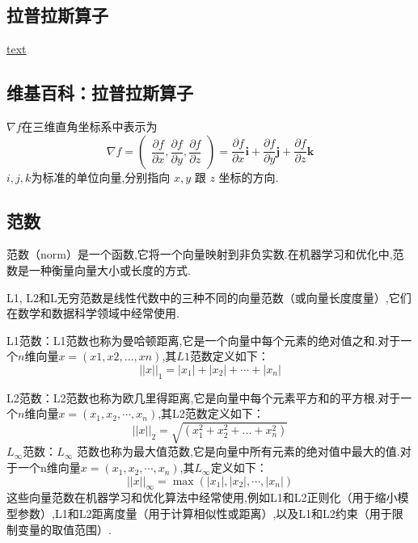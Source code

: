 \documentclass{book}
\begin{document}
\subsection{拉普拉斯算子}
\href{https://zh.wikipedia.org/zh-hans/%E6%8B%89%E6%99%AE%E6%8B%89%E6%96%AF%E7%AE%97%E5%AD%90}{text}
\subsection{维基百科：拉普拉斯算子}
$\nabla f$在三维直角坐标系中表示为
\begin{equation}
  {\displaystyle \nabla f={\begin{pmatrix}{\dfrac {\partial f}{\partial x}},{\dfrac {\partial f}{\partial y}},{\dfrac {\partial f}{\partial z}}\end{pmatrix}}={\dfrac {\partial f}{\partial x}}\mathbf {i} +{\dfrac {\partial f}{\partial y}}\mathbf {j} +{\dfrac {\partial f}{\partial z}}\mathbf {k} }
\end{equation}
$i, j, k $为标准的单位向量,分别指向 $x, y$ 跟 $z$ 坐标的方向.
\subsection{范数}
范数（norm）是一个函数,它将一个向量映射到非负实数.在机器学习和优化中,范数是一种衡量向量大小或长度的方式.

L1, L2和L无穷范数是线性代数中的三种不同的向量范数（或向量长度度量）,它们在数学和数据科学领域中经常使用.

L1范数：L1范数也称为曼哈顿距离,它是一个向量中每个元素的绝对值之和.对于一个$n$维向量$x = (x1, x2, ..., xn)$,其$L1$范数定义如下：
\begin{equation}
  ||x||_1 = |x_1| + |x_2| + \cdots + |x_n|
\end{equation}

L2范数：L2范数也称为欧几里得距离,它是向量中每个元素平方和的平方根.对于一个$n$维向量$x = (x_1, x_2,\cdots, x_n)$,其L2范数定义如下：
\begin{equation}
  ||x||_2 = \sqrt{(x_1^2 + x_2^2 + ... + x_n^2)}
\end{equation}
$L_\infty$范数：$L_\infty$ 范数也称为最大值范数,它是向量中所有元素的绝对值中最大的值.对于一个n维向量$x = (x_1, x_2,\cdots, x_n)$,其$L_\infty$定义如下：
\begin{equation}
  ||x||_\infty = \max(|x_1|, |x_2|,\cdots, |x_n|)
\end{equation}
这些向量范数在机器学习和优化算法中经常使用,例如L1和L2正则化（用于缩小模型参数）,L1和L2距离度量（用于计算相似性或距离）,以及L1和L2约束（用于限制变量的取值范围）.
\end{document}
